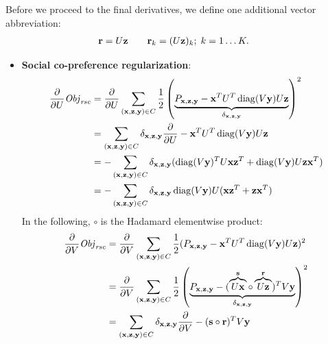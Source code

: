 Before we proceed to the final derivatives, we define one additional
vector abbreviation: 
\begin{align*}
\mathbf{r} & = U \mathbf{z} \qquad \mathbf{r}_{k} = (U \mathbf{z})_{k}; \; k=1\ldots K .
\end{align*}
\begin{itemize}
\item {\bf Social co-preference regularization}:
\begin{align*}
\frac{\partial}{\partial U} \Obj_\rsc & = \frac{\partial}{\partial U} \sum_{(\x,\z,\y) \in C} \frac{1}{2} \left( \underbrace{P_{\x,\z,\y} - \x^T U^T \diag(V\y) U \z}_{\delta_{\x,\z,\y}} \right)^2\\
& = \sum_{(\x,\z,\y) \in C} \delta_{\x,\z,\y} \frac{\partial}{\partial U} - \x^T U^T \diag(V\y) U \z \\
& = - \sum_{(\x,\z,\y) \in C} \delta_{\x,\z,\y} (\diag(V\y)^T U \x \z^T + \diag(V\y) U \z \x^T)\\ %
& = - \sum_{(\x,\z,\y) \in C} \delta_{\x,\z,\y} \diag(V\y) U (\x \z^T + \z \x^T)\\
\end{align*}
In the following, $\circ$ is the Hadamard elementwise product:
\begin{align*}
\frac{\partial}{\partial V} \Obj_\rsc & = \frac{\partial}{\partial V} \sum_{(\x,\z,\y) \in C} \frac{1}{2} (P_{\x,\z,\y} - \x^T U^T \diag(V\y) U \z)^2\\
 & = \frac{\partial}{\partial V} \sum_{(\x,\z,\y) \in C} \frac{1}{2} \left( \underbrace{P_{\x,\z,\y} -  (\overbrace{U\x}^\s \circ \overbrace{U\z}^\r)^T V\y}_{\delta_{\x,\z,\y}} \right)^2\\
 & = \sum_{(\x,\z,\y) \in C} \delta_{\x,\z,\y} \frac{\partial}{\partial V} - (\s \circ \r)^T V\y\\

\end{align*}
\end{itemize}
